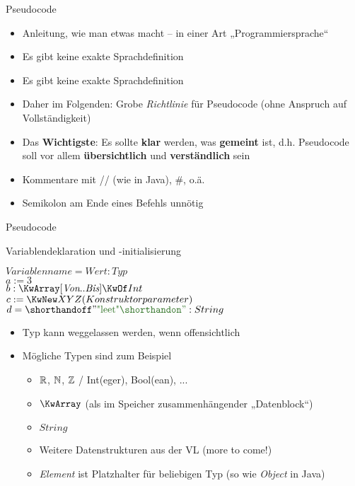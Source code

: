 
\begin{frame}{Pseudocode}
	\begin{itemize}
		\item Anleitung, wie man etwas macht -- in einer Art „Programmiersprache“
		\pause
		\item[\Pros] Es gibt keine exakte Sprachdefinition
		\pause
		\item[\Cons] Es gibt keine exakte Sprachdefinition
		\pause
		\item Daher im Folgenden: Grobe \textit{Richtlinie} für Pseudocode (ohne Anspruch auf Vollständigkeit)
		\pause
		\item Das \textbf{Wichtigste}: Es sollte \textbf{klar} werden, was \textbf{gemeint} ist, d.h. Pseudocode soll vor allem \textbf{übersichtlich} und \textbf{verständlich} sein
		\pause
		\item Kommentare mit // (wie in Java), \#, o.ä.
		\pause
		\item Semikolon am Ende eines Befehls unnötig
	\end{itemize}
\end{frame}


\begin{frame}{Pseudocode}  %
	\begin{exampleblock}{Variablendeklaration und -initialisierung}
		\begin{algorithm}[H]
			$ Variablenname = Wert : Typ $ \\
			$ a := 3 $ \\
			$ b : \KwArray[\textit{Von}..\textit{Bis}] \KwOf Int $  \\
			$ c := \KwNew XYZ(Konstruktorparameter) $ \\
			$ d = \str{leet} : String $ \\
		\end{algorithm}
	\end{exampleblock}
	\begin{itemize}
		\pause
		\item Typ kann weggelassen werden, wenn offensichtlich
		\pause
		\item Mögliche Typen sind zum Beispiel \\
		\begin{itemize}
			\pause
			\item $\mathbb{R}$, $\mathbb{N}$, $\mathbb{Z}$ / Int(eger), Bool(ean), ...
			\pause
			\item $\KwArray$ (als im Speicher zusammenhängender „Datenblock“)
			\pause
			\item $String$
			\pause
			\item Weitere Datenstrukturen aus der VL (more to come!)
			\pause
			\item \textit{Element} ist Platzhalter für beliebigen Typ (so wie \textit{Object} in Java)
		\end{itemize}
	\end{itemize}
\end{frame}


